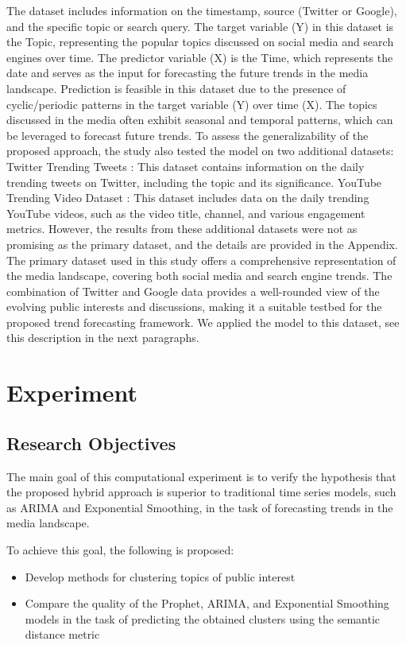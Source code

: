 The dataset includes information on the timestamp, source (Twitter or Google), and the specific topic or search query.
The target variable (Y) in this dataset is the Topic, representing the popular topics discussed on social media and search engines over time. The predictor variable (X) is the Time, which represents the date and serves as the input for forecasting the future trends in the media landscape.
Prediction is feasible in this dataset due to the presence of cyclic/periodic patterns in the target variable (Y) over time (X). The topics discussed in the media often exhibit seasonal and temporal patterns, which can be leveraged to forecast future trends.
To assess the generalizability of the proposed approach, the study also tested the model on two additional datasets:
Twitter Trending Tweets \cite{TwitterTrends}: This dataset contains information on the daily trending tweets on Twitter, including the topic and its significance.
YouTube Trending Video Dataset \cite{YouTubeTrends}: This dataset includes data on the daily trending YouTube videos, such as the video title, channel, and various engagement metrics.
However, the results from these additional datasets were not as promising as the primary dataset, and the details are provided in the Appendix.
The primary dataset used in this study offers a comprehensive representation of the media landscape, covering both social media and search engine trends. The combination of Twitter and Google data provides a well-rounded view of the evolving public interests and discussions, making it a suitable testbed for the proposed trend forecasting framework.
We  applied the model to this dataset, see this description in the next paragraphs.


\section{Experiment}
\subsection{Research Objectives}
The main goal of this computational experiment is to verify the hypothesis that the proposed hybrid approach is superior to traditional time series models, such as ARIMA and Exponential Smoothing, in the task of forecasting trends in the media landscape.

To achieve this goal, the following is proposed:
\begin{itemize}
\item Develop methods for clustering topics of public interest
\item Compare the quality of the Prophet, ARIMA, and Exponential Smoothing models in the task of predicting the obtained clusters using the semantic distance metric
\end{itemize}

